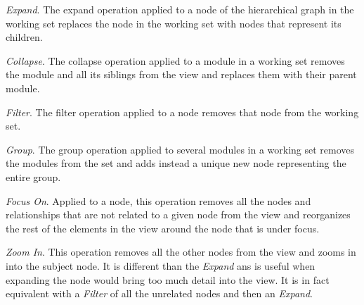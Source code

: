 \documentclass[preprint,12pt]{elsarticle}
\begin{document}
\begin{description}

\item {\em Expand}. The expand operation applied to a node of the hierarchical graph in the working set replaces the node in the working set with nodes that represent its children. 

%
%
%
\item {\em Collapse}. The collapse operation applied to a module in a working set removes the module and all its siblings from the view and replaces them with their parent module. 

%
%
%
\item {\em Filter}. The filter operation applied to a node removes that node from the working set. 

%
%

\item {\em Group}. The group operation applied to several modules in a working set removes the modules from the set and adds instead a unique new node representing the entire group. 

\item {\em Focus On}. Applied to a node, this operation removes all the nodes and relationships that are not related to a given node from the view and reorganizes the rest of the elements in the view around the node that is under focus.

\item {\em Zoom In}. This operation removes all the other nodes from the view and zooms in into the subject node. It is different than the {\em Expand} ans is useful when expanding the node would bring too much detail into the view. It is in fact equivalent with a {\em Filter} of all the unrelated nodes and then an {\em Expand}.

%
%
%
\end{description}
\end{document}

